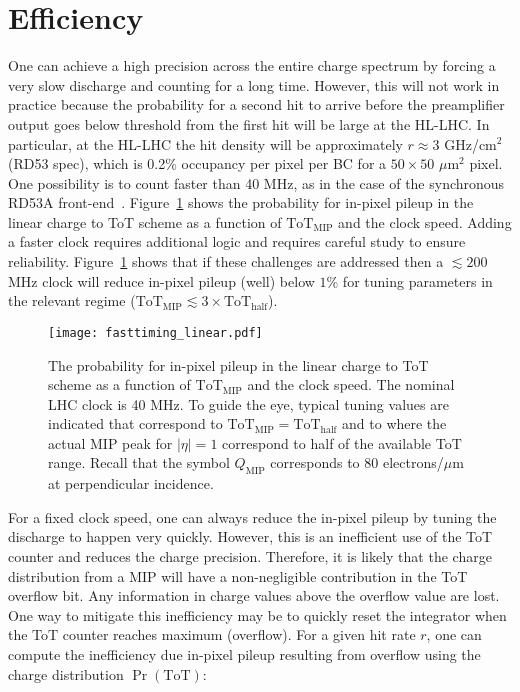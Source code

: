 \documentclass[12pt]{article}
\begin{document}
\section{Efficiency}
\label{sec:effic}

One can achieve a high precision across the entire charge spectrum by forcing a very slow discharge and counting for a long time.  However, this will not work in practice because the probability for a second hit to arrive before the preamplifier output goes below threshold from the first hit will be large at the HL-LHC.  In particular, at the HL-LHC the hit density will be approximately $r\approx3$ GHz/cm$^{2}$ (RD53 spec), which is 0.2\% occupancy per pixel per BC for a $50\times 50$ $\mu$m$^2$ pixel.  One possibility is to count faster than 40 MHz, as in the case of the synchronous RD53A front-end~\cite{7581969}.   Figure~\ref{fig:efficiency:fasttiming} shows the probability for in-pixel pileup in the linear charge to ToT scheme as a function of $\text{ToT}_\text{MIP}$ and the clock speed.  Adding a faster clock requires additional logic and requires careful study to ensure reliability.  Figure~\ref{fig:efficiency:fasttiming} shows that if these challenges are addressed then a $\lesssim 200$ MHz clock will reduce in-pixel pileup (well) below $1\%$ for tuning parameters in the relevant regime ($\text{ToT}_\text{MIP}\lesssim 3\times \text{ToT}_\text{half}$).

\begin{figure}[h!]
\centering
\texttt{[image: fasttiming\_linear.pdf]}
\caption{The probability for in-pixel pileup in the linear charge to ToT scheme as a function of $\text{ToT}_\text{MIP}$ and the clock speed.  The nominal LHC clock is 40 MHz. To guide the eye, typical tuning values are indicated that correspond to $\text{ToT}_\text{MIP}=\text{ToT}_\text{half}$ and to where the actual MIP peak for $|\eta|=1$ correspond to half of the available ToT range.  Recall that the symbol $Q_\text{MIP}$ corresponds to 80 electrons/$\mu$m at perpendicular incidence.}
\label{fig:efficiency:fasttiming}
\end{figure}

For a fixed clock speed, one can always reduce the in-pixel pileup by tuning the discharge to happen very quickly.  However, this is an inefficient use of the ToT counter and reduces the charge precision.  Therefore, it is likely that the charge distribution from a MIP will have a non-negligible contribution in the ToT overflow bit.  Any information in charge values above the overflow value are lost.  One way to mitigate this inefficiency may be to quickly reset the integrator when the ToT counter reaches maximum (overflow).  For a given hit rate $r$, one can compute the inefficiency due in-pixel pileup resulting from overflow using the charge distribution $\Pr(\text{ToT})$: 
\end{document}
